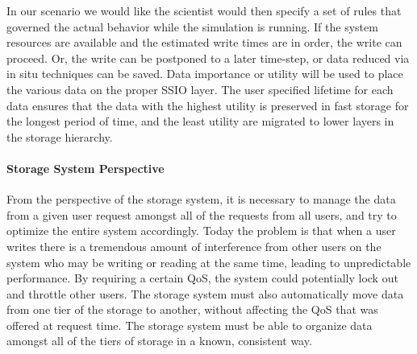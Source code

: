   In our  scenario we would like the scientist would then specify a set of rules that governed the actual behavior while the simulation is running.
If the system resources are available and the estimated write times are in order, the write can proceed.
Or, the write can be postponed to a later time-step, or data reduced via in situ techniques can be saved.
Data importance or utility will be used to place the various data on the proper SSIO layer.
The user specified lifetime for each data ensures that the data with the highest utility is preserved in fast storage
for the longest period of time, and the least utility are migrated to lower layers in the storage hierarchy.
%

\paragraph{Storage System Perspective}
\label{subsec:storage-perspective}
From the perspective of the storage system, it is necessary to manage the data from
a given user request amongst all of the requests from all users, and try to optimize the
entire system accordingly. Today the problem is that when a user writes there is a
tremendous amount of interference from other users on the system who may be
writing or reading at the same time, leading to unpredictable performance.
By requiring a certain QoS, the system could potentially lock out and throttle other users. 
The storage system must also automatically move data from one tier of the storage to
another, without affecting the QoS that was offered at request
time. The storage system must be able to organize
data amongst all of the tiers of storage in a known, consistent way.

